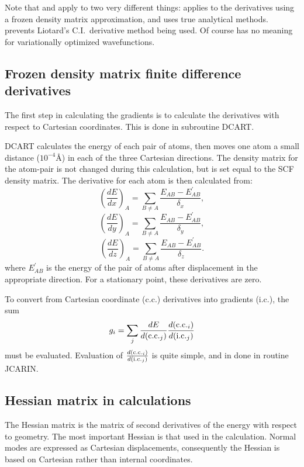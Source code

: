 Note that  and  apply to two very different things:
 applies to the derivatives using a frozen density matrix
approximation, and uses true analytical methods.   prevents
Liotard's C.I.\ derivative method being used.  Of course  has no
meaning for variationally optimized wavefunctions.

\subsection{Frozen density matrix finite difference derivatives}

The first step in calculating the gradients is to calculate the derivatives
with respect to Cartesian coordinates.  This is done in subroutine DCART.

DCART calculates the energy of each pair of atoms, then moves one atom a small
distance ($10^{-4}$\AA ) in each of the three Cartesian directions.  The
density matrix for the atom-pair is not changed during this calculation, but is
set equal to the SCF density matrix. The derivative for each atom is then
calculated  from:
$$\left (\frac{dE}{dx}\right )_A = \sum_{B\neq A}\frac{E_{AB}-E_{AB}^{'}}{\delta_x}, $$
$$\left (\frac{dE}{dy}\right )_A = \sum_{B\neq A}\frac{E_{AB}-E_{AB}^{'}}{\delta_y}, $$
$$\left (\frac{dE}{dz}\right )_A = \sum_{B\neq A}\frac{E_{AB}-E_{AB}^{'}}{\delta_z}. $$
where $E_{AB}^{'}$ is the energy of the pair of atoms after displacement in the
appropriate direction.  For a stationary point, these derivatives are zero.

To convert from Cartesian coordinate (c.c.) derivatives into gradients (i.c.),
the sum
$$
g_i = \sum_j\frac{dE}{d({\rm c.c.}_j)}\frac{d({\rm c.c.}_i)}{d({\rm i.c.}_j)} 
$$
must be evaluated.  Evaluation of  
$\frac{d({\rm c.c.}_i)}{d({\rm i.c.}_j)}$  
is quite simple, and in done in routine JCARIN.

\subsection{Hessian matrix in  calculations}\label{ssd}
The Hessian matrix is the matrix of second derivatives of the energy with
respect to geometry. The most important Hessian is that used in the
 calculation.  Normal modes are expressed as Cartesian
displacements, consequently the Hessian is based on Cartesian rather than
internal coordinates.

